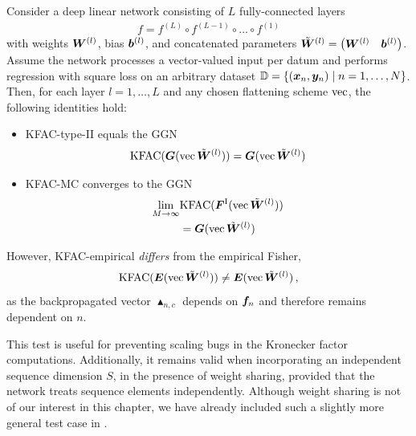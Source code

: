 \begin{test}
  Consider a deep linear network consisting of $L$ fully-connected layers
  \begin{align*}
    f = f^{(L)} \circ f^{(L-1)} \circ \ldots \circ f^{(1)}
  \end{align*}
  with weights $\mW^{(l)}$, bias $\vb^{(l)}$, and concatenated parameters $\tilde{\mW}^{(l)} = \begin{pmatrix} \mW^{(l)} & \vb^{(l)} \end{pmatrix}$.
  Assume the network processes a vector-valued input per datum and performs regression with square loss on an arbitrary dataset $\sD = \{ (\vx_n, \vy_n) \mid n = 1, \dots, N \}$.
  Then, for each layer $l=1,\dots,L$ and any chosen flattening scheme $\vec$, the following identities hold:
  \begin{itemize}[leftmargin=0.5cm]
  \item KFAC-type-II equals the GGN
    \begin{align*}
      \kfac(\mG(\vec \tilde{\mW}^{(l)}))
      =
      \mG(\vec\tilde{\mW}^{(l)})
    \end{align*}
  \item KFAC-MC converges to the GGN
    \begin{align*}
      \lim_{M \to \infty}& \kfac(\mF^{\text{I}}(\vec \tilde{\mW}^{(l)}))
      \\&=
      \mG(\vec \tilde{\mW}^{(l)})
    \end{align*}

  \end{itemize}
  However, KFAC-empirical \emph{differs} from the empirical Fisher,
  \begin{align*}
    \kfac(\mE(\vec \tilde{\mW}^{(l)}))
    \neq
    \mE(\vec \tilde{\mW}^{(l)})\,,
  \end{align*}
  as the backpropagated vector $\blacktriangle_{n,c}$ depends on $\vf_n$ and therefore remains dependent on $n$.
\end{test}

This test is useful for preventing scaling bugs in the Kronecker factor computations.
Additionally, it remains valid when incorporating an independent sequence dimension $S$, \ie in the presence of weight sharing, provided that the network treats sequence elements independently.
Although weight sharing is not of our interest in this chapter, we have already included such a slightly more general test case in .

